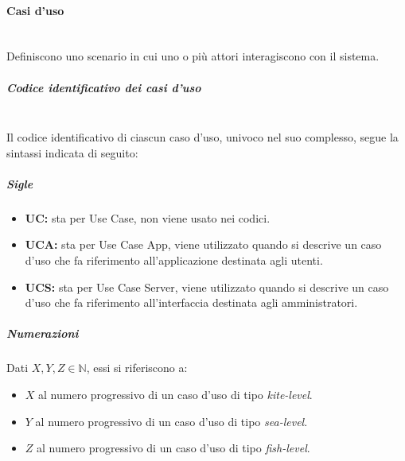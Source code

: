 \paragraph{Casi d'uso}\mbox{}\\
Definiscono uno scenario in cui uno o più attori interagiscono con il sistema.
\setlength{\parindent}{-0.1em}
\subparagraph{Codice identificativo dei casi d'uso}\mbox{}\\
Il codice identificativo di ciascun caso d’uso, univoco nel suo complesso, segue la sintassi indicata di seguito:
\subparagraph{Sigle}
\begin{itemize}
	\item \textbf{UC:} sta per Use Case, non viene usato nei codici.
	\item \textbf{UCA:} sta per Use Case App, viene utilizzato quando si descrive un caso d'uso che fa riferimento all'applicazione destinata agli utenti.
	\item \textbf{UCS:} sta per Use Case Server, viene utilizzato quando si descrive un caso d'uso che fa riferimento all'interfaccia destinata agli amministratori.
\end{itemize}

\subparagraph{Numerazioni}
Dati $X, Y, Z \in \mathbb{N}$, essi si riferiscono a:
\begin{itemize}
	\item $X$ al numero progressivo di un caso d'uso di tipo \textit{kite-level}.
	\item $Y$ al numero progressivo di un caso d'uso di tipo \textit{sea-level}.
	\item $Z$ al numero progressivo di un caso d'uso di tipo \textit{fish-level}.
\end{itemize}


